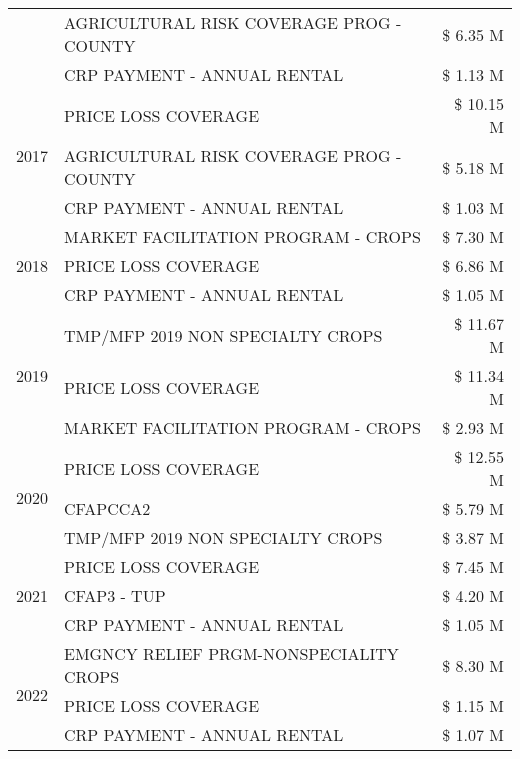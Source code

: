 \begin{tabular}{llr}
 & AGRICULTURAL RISK COVERAGE PROG - COUNTY & \$ 6.35 M \\
 & CRP PAYMENT - ANNUAL RENTAL & \$ 1.13 M \\
\cline{1-3}
\multirow[t]{3}{*}{2017} & PRICE LOSS COVERAGE & \$ 10.15 M \\
 & AGRICULTURAL RISK COVERAGE PROG - COUNTY & \$ 5.18 M \\
 & CRP PAYMENT - ANNUAL RENTAL & \$ 1.03 M \\
\cline{1-3}
\multirow[t]{3}{*}{2018} & MARKET FACILITATION PROGRAM - CROPS & \$ 7.30 M \\
 & PRICE LOSS COVERAGE & \$ 6.86 M \\
 & CRP PAYMENT - ANNUAL RENTAL & \$ 1.05 M \\
\cline{1-3}
\multirow[t]{3}{*}{2019} & TMP/MFP 2019 NON SPECIALTY CROPS & \$ 11.67 M \\
 & PRICE LOSS COVERAGE & \$ 11.34 M \\
 & MARKET FACILITATION PROGRAM - CROPS & \$ 2.93 M \\
\cline{1-3}
\multirow[t]{3}{*}{2020} & PRICE LOSS COVERAGE & \$ 12.55 M \\
 & CFAPCCA2 & \$ 5.79 M \\
 & TMP/MFP 2019 NON SPECIALTY CROPS & \$ 3.87 M \\
\cline{1-3}
\multirow[t]{3}{*}{2021} & PRICE LOSS COVERAGE & \$ 7.45 M \\
 & CFAP3 - TUP & \$ 4.20 M \\
 & CRP PAYMENT - ANNUAL RENTAL & \$ 1.05 M \\
\cline{1-3}
\multirow[t]{3}{*}{2022} & EMGNCY RELIEF PRGM-NONSPECIALITY CROPS & \$ 8.30 M \\
 & PRICE LOSS COVERAGE & \$ 1.15 M \\
 & CRP PAYMENT - ANNUAL RENTAL & \$ 1.07 M \\
\cline{1-3}
\bottomrule
\end{tabular}
